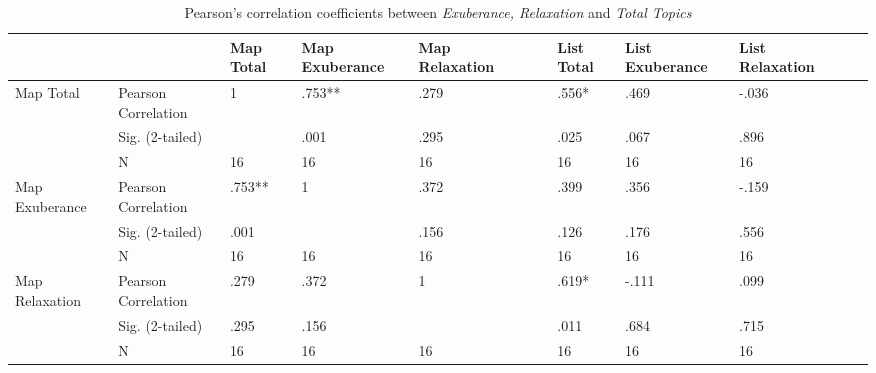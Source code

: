 \begin{landscape}
\begin{table}[hbtp!]
\centering
\caption{Pearson's correlation coefficients between \textit{Exuberance, Relaxation} and \textit{Total Topics}}
\label{res:samcomposites}\vspace{0.3cm}
\begin{tabular}{|l|l|m{1.8cm}p{2.5cm}p{2cm}m{1.8cm}p{2.5cm}p{2cm}|}
\hline
  &                     & Map Total  & Map \newline Exuberance & Map  ~  ~  ~  ~  Relaxation & List Total & List \newline Exuberance & List   ~  ~  ~  ~  Relaxation \\ \hline
Map Total                                            & Pearson Correlation & 1                & .753**         & .279           & .556*             & .469            & -.036           \\
                                                            & Sig. (2-tailed)     &                  & .001           & .295           & .025              & .067            & .896            \\
                                                            & N                   & 16               & 16             & 16             & 16                & 16              & 16              \\
Map Exuberance                                              & Pearson Correlation & .753**           & 1              & .372           & .399              & .356            & -.159           \\
                                                            & Sig. (2-tailed)     & .001             &                & .156           & .126              & .176            & .556            \\
                                                            & N                   & 16               & 16             & 16             & 16                & 16              & 16              \\
Map Relaxation                                              & Pearson Correlation & .279             & .372           & 1              & .619*             & -.111           & .099            \\
                                                            & Sig. (2-tailed)     & .295             & .156           &                & .011              & .684            & .715            \\
                                                            & N                   & 16               & 16             & 16             & 16                & 16              & 16              \\

\end{tabular}
\end{table}
\end{landscape}
